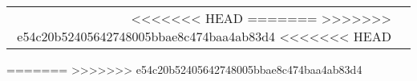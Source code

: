 \documentclass[a4paper,10pt]{article}
\begin{document}
\begin{tabular}{r|p{14cm}}
<<<<<<< HEAD
=======
>>>>>>> e54c20b52405642748005bbae8c474baa4ab83d4
<<<<<<< HEAD
\end{tabular}
=======
>>>>>>> e54c20b52405642748005bbae8c474baa4ab83d4

\end{document}
